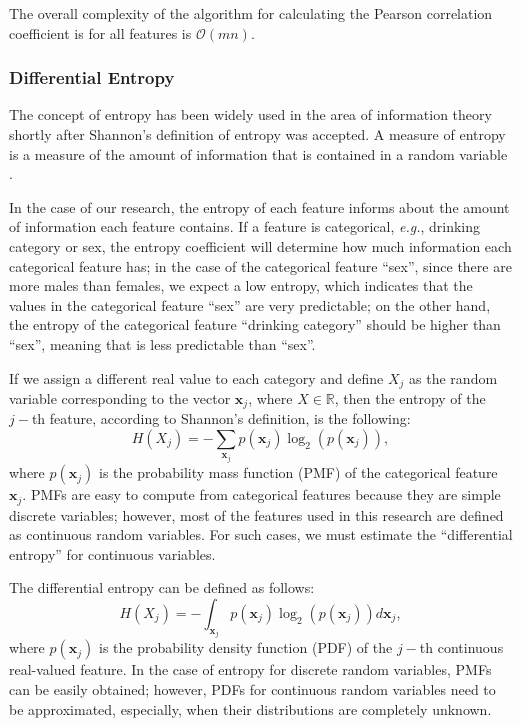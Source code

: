 \documentclass{bmcart}
\begin{document}
The overall complexity of the algorithm for calculating the Pearson correlation
coefficient is for all features is $\mathcal{O}(mn)$.  

\subsubsection*{Differential Entropy}
The concept of entropy has been widely used in the area of information theory
shortly after Shannon's definition of entropy was accepted. A measure of
entropy is a measure of the amount of information that is contained in a
random variable \cite{torkkola2008feature}. 

In the case of our research, the entropy of each feature informs about the
amount of information each feature contains. If a feature is categorical,
\emph{e.g.}, drinking category or sex, the entropy coefficient will determine how much
information each categorical feature has; in the case of the categorical
feature ``sex'', since there are more males than females, we expect a low
entropy, which indicates that the values in the categorical feature ``sex'' are
very predictable; on the other hand, the entropy of the categorical feature
``drinking category'' should be higher than ``sex'', meaning that is less
predictable than ``sex''.

If we assign a different real value to each category and define $X_j$ as 
the random variable corresponding to the vector $\mathbf{x}_j$, where $X
\in \mathbb{R}$, then the entropy of the $j-$th feature, according to 
Shannon's definition, is the following:
\begin{equation}
H(X_j) = - \sum_{\mathbf{x}_j} p(\mathbf{x}_j) \log_2 (p(\mathbf{x}_j)) , 
\label{eq:pearson}
\end{equation}
where $p(\mathbf{x}_j)$ is the probability mass function (PMF) of the categorical feature
$\mathbf{x}_j$. PMFs are easy to compute from categorical features because they are
simple discrete variables; however, most of the
features used in this research are defined as continuous random variables. For
such cases, we must estimate the ``differential entropy'' for continuous
variables.

The differential entropy can be defined as follows:
\begin{equation}
H(X_j) = - \int_{\mathbf{x}_j} p(\mathbf{x}_j) \log_2 (p(\mathbf{x}_j))
d\mathbf{x}_j, 
\end{equation}
where $p(\mathbf{x}_j)$ is the probability density function (PDF) of the
$j-$th continuous real-valued feature. In the case of entropy for discrete
random variables, PMFs can be easily obtained; however, PDFs for continuous
random variables need to be approximated, especially, when their distributions
are completely unknown. 
\end{document}
